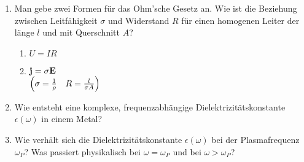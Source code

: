 \documentclass{scrartcl}
\begin{document}
\begin{enumerate}
    \item Man gebe zwei Formen für das Ohm'sche Gesetz an. Wie ist die
          Beziehung zwischen Leitfähigkeit $\sigma$ und Widerstand $R$ 
          für einen homogenen Leiter der länge $l$ und mit 
          Querschnitt $A$?
          \begin{enumerate}
            \item $U=IR$
            \item $\vb j= \sigma \vb E$\\
              $\qty(\sigma=\frac{1}{\rho}\quad R=\frac{l}{\sigma A})$
          \end{enumerate}

    \item Wie entsteht eine komplexe, frequenzabhängige 
          Dielektrizitätskonstante $\epsilon(\omega)$ in einem Metal?

    \item Wie verhält sich die Dielektrizitätskonstante $\epsilon(\omega)$
          bei der Plasmafrequenz $\omega_P$? Was passiert physikalisch bei
          $\omega=\omega_P$ und bei $\omega>\omega_P$?

  \end{enumerate}
\end{document}
